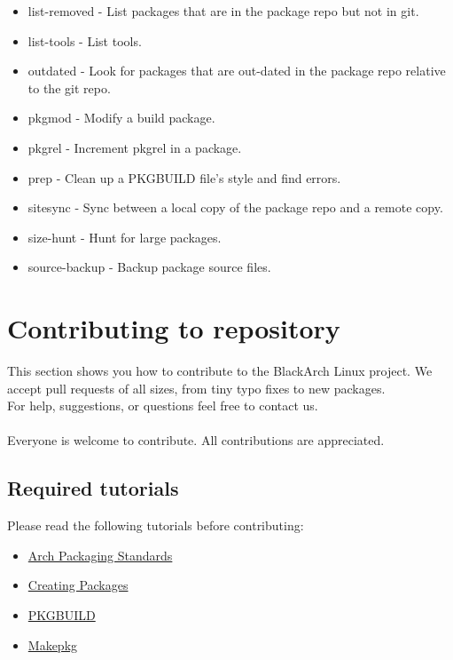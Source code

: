 \documentclass[a4paper, oneside, 11pt]{book}
\begin{document}
\begin{itemize}
	\item list-removed - List packages that are in the package repo but not in git.
	\item list-tools - List tools.
	\item outdated - Look for packages that are out-dated in the package repo relative to the git repo.
	\item pkgmod - Modify a build package.
	\item pkgrel - Increment pkgrel in a package.
	\item prep - Clean up a PKGBUILD file's style and find errors.
	\item sitesync - Sync between a local copy of the package repo and a remote copy.
	\item size-hunt - Hunt for large packages.
	\item source-backup - Backup package source files.
\end{itemize}

\section{Contributing to repository}
This section shows you how to contribute to the BlackArch Linux project. We
accept pull requests of all sizes, from tiny typo fixes to new packages.\\For
help, suggestions, or questions feel free to contact us.
\\\\
Everyone is welcome to contribute. All contributions are appreciated.

\subsection{Required tutorials}
Please read the following tutorials before contributing:
\begin{itemize}
\item
\href{https://wiki.archlinux.org/index.php/Arch\_Packaging\_Standards)}{Arch
Packaging Standards}
\item \href{https://wiki.archlinux.org/index.php/Creating\_Packages}{Creating
Packages}
\item \href{https://wiki.archlinux.org/index.php/PKGBUILD}{PKGBUILD}
\item \href{https://wiki.archlinux.org/index.php/Makepkg}{Makepkg}
\end{itemize}
\end{document}
